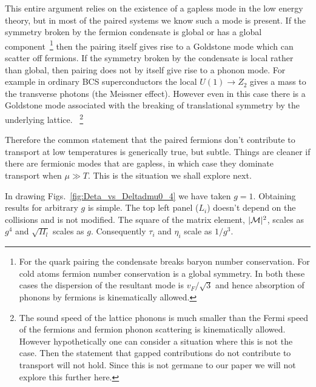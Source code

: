 \documentclass[10pt, aps, prd, superscriptaddress, nofootinbib, 
               amsmath, amssymb, twocolumn,
               preprintnumbers, showpacs,
               raggedbottom,
               floatfix]{revtex4-1}
\begin{document}
This entire argument relies on the existence of a gapless mode in the low
energy theory, but in most of the paired systems we know such a mode is present. If
the symmetry broken by the fermion condensate is global or has a global
component~\footnote{For the quark pairing the condensate breaks baryon number
conservation. For cold atoms fermion number conservation is a global symmetry.
In both these cases the dispersion of the resultant mode is $v_F/\sqrt{3}$ and
hence absorption of phonons by fermions is kinematically allowed.} then the
pairing itself gives rise to a Goldstone mode which can scatter off fermions.
If the symmetry broken by the condensate is local rather than global, then
pairing does not by itself give rise to a phonon mode. For example in ordinary
BCS superconductors the local $U(1)\rightarrow Z_2$ gives a mass to the
transverse photons (the Meissner effect). However even in this case there is a
Goldstone mode associated with the breaking of translational symmetry by
the underlying lattice. ~\footnote{The sound speed of the lattice phonons is
much smaller than the Fermi speed of the fermions and fermion phonon scattering
is kinematically allowed. However hypothetically one can consider a situation
where this is not the case. Then the statement that gapped contributions do not
contribute to transport will not hold. Since this is not germane to our paper we will not explore this
further here.}

Therefore the common statement that the paired fermions don't contribute to
transport at low temperatures is generically true, but subtle.  Things are
cleaner if there are fermionic modes that are gapless, in which case they
dominate transport when $\mu\gg T$. This is the situation we shall explore
next.

In drawing Figs.~\ref{fig:Deta_vs_Deltadmu0_4} we have taken $g=1$. Obtaining
results for arbitrary $g$ is simple. The top left panel ($L_i$) doesn't depend
on the collisions and is not modified. The square of the matrix element,
$|{\cal{M}}|^2$, scales as ${g^4}$ and $\sqrt{\Pi_l}$ scales as $g$.
Consequently $\tau_i$ and $\eta_i$ scale as ${1}/{g^3}$.
\end{document}
